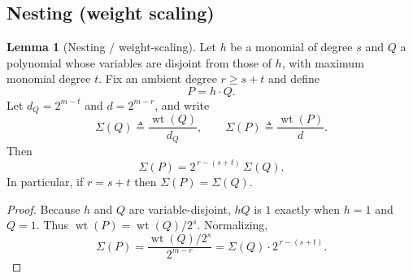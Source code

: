\documentclass[conference]{IEEEtran}
\theoremstyle{definition}
\newtheorem{lemma}{Lemma}
\newtheorem{remark}{Remark}
\newcommand{\wt}{\operatorname{wt}}
\begin{document}

\subsection{Nesting (weight scaling)}

\begin{lemma}[Nesting / weight-scaling]
\label{lem:nesting}
Let $h$ be a monomial of degree $s$ and $Q$ a polynomial whose variables are disjoint from those of $h$, with maximum monomial degree $t$. Fix an ambient degree $r\ge s+t$ and define
\[
P = h\cdot Q.
\]
Let $d_Q=2^{m-t}$ and $d=2^{m-r}$, and write
\[
\Sigma(Q) \triangleq \frac{\wt(Q)}{d_Q},\qquad
\Sigma(P) \triangleq \frac{\wt(P)}{d}.
\]
Then
\begin{equation}
\Sigma(P) = 2^{\,r-(s+t)}\,\Sigma(Q).
\label{eq:nesting}
\end{equation}
In particular, if $r=s+t$ then $\Sigma(P)=\Sigma(Q)$.
\end{lemma}

\begin{proof}
Because $h$ and $Q$ are variable-disjoint, $hQ$ is $1$ exactly when $h=1$ and $Q=1$. Thus $\wt(P)=\wt(Q)/2^s$. Normalizing,
\[
\Sigma(P) = \frac{\wt(Q)/2^s}{2^{m-r}}
= \Sigma(Q)\cdot 2^{\,r-(s+t)}.
\]
\end{proof}



\end{document}
